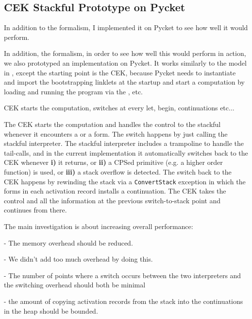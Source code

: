 
    \subsection{CEK \+ Stackful Prototype on Pycket}

      \begin{paragraph-here}
        In addition to the formalism, I implemented it on Pycket to see how well it would perform.
      \end{paragraph-here}

      In addition, the formalism, in order to see how well this would perform
      in action, we also prototyped an implementation on Pycket. It works similarly to the model in , except
      the starting point is the CEK, because Pycket needs to instantiate and
      import the bootstrapping linklets at the startup and start a
      computation by loading and running the program via the
      ,  etc.

      \begin{paragraph-here}
        CEK starts the computation, switches at every let, begin, continuations etc...
      \end{paragraph-here}

      The CEK starts the computation and handles the control to the stackful
      whenever it encounters a  or a 
      form. The switch happens by just calling the stackful interpreter. The
      stackful interpreter includes a trampoline to handle the tail-calls,
      and in the current implementation it automatically switches back to
      the CEK whenever \textbf{i)} it returns, or \textbf{ii)} a CPSed
      primitive (e.g. a higher order function) is used, or \textbf{iii)} a
      stack overflow is detected. The switch back to the CEK happens by
      rewinding the stack via a \verb|ConvertStack| exception in which the
      forms in each activation record installs a continuation. The CEK takes
      the control and all the information at the previous switch-to-stack
      point and continues from there.

      \begin{show-experiment}
        The main investigation is about increasing overall performance:

        - The memory overhead should be reduced.

        - We didn't add too much overhead by doing this.

          - The number of points where a switch occurs between the two interpreters and the switching overhead should both be minimal

          - the amount of copying activation records from the stack into the continuations in the heap should be bounded.
      \end{show-experiment}

